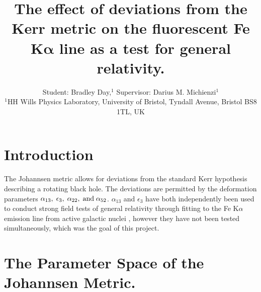 \documentclass[fleqn,usenatbib]{mnras}
\title[Short title, max. 45 characters]{The effect of deviations from the Kerr metric on the fluorescent Fe K$\bm\alpha$ line as a test for general relativity.}
\author[B.Day \& D. M. Michienzi]{
Student: Bradley Day,$^{1}$
Supervisor: Darius M. Michienzi$^{1}$
\\
$^{1}$HH Wills Physics Laboratory, University of Bristol, Tyndall Avenue, Bristol BS8 1TL, UK
}
\begin{document}
\label{firstpage}
\pagerange{\pageref{firstpage}--\pageref{lastpage}}
\maketitle




\section{Introduction}

The Johannsen metric \cite{johannsen_regular_2013} allows for deviations from the standard Kerr hypothesis describing a rotating black hole. The deviations are permitted by the deformation parameters $\alpha_{13},\;\epsilon_{3},\;\alpha_{22},\;{\rm and}\; \alpha_{52}$. $\alpha_{13}$ and $\epsilon_{3}$ have both independently been used to conduct strong field tests of general relativity through fitting to the Fe K$\alpha$ emission line from active galactic nuclei \cite{bambi_testing_2017, cao_testing_2018, tripathi_constraining_2019, tripathi_testing_2026}, however they have not been tested simultaneously, which was the goal of this project. 

\section{The Parameter Space of the Johannsen Metric.}
\end{document}
